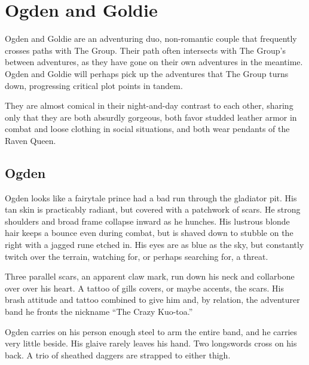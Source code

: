 \section{Ogden and Goldie}\label{sec:ogdenAndGoldie}

Ogden and Goldie are an adventuring duo, non-romantic couple that frequently crosses paths with
The Group.
Their path often intersects with The Group's between adventures, as they have gone on their own
adventures in the meantime.
Ogden and Goldie will perhaps pick up the adventures that The Group turns down, progressing
critical plot points in tandem.

They are almost comical in their night-and-day contrast to each other, sharing only that they are
both absurdly gorgeous, both favor studded leather armor in combat and loose clothing in social
situations, and both wear pendants of the Raven Queen.

\subsection{Ogden}\label{subsec:ogden}

  \begin{aloud}
  \label{description:ogden}
  Ogden looks like a fairytale prince had a bad run through the gladiator pit.
  His tan skin is practicably radiant, but covered with a patchwork of scars.
  He strong shoulders and broad frame collapse inward as he hunches.
  His lustrous blonde hair keeps a bounce even during combat, but is shaved down to stubble on
    the right with a jagged rune etched in.
  His eyes are as blue as the sky, but constantly twitch over the terrain, watching for, or perhaps
    searching for, a threat.

  Three parallel scars, an apparent claw mark, run down his neck and collarbone over over his heart.
  A tattoo of gills covers, or maybe accents, the scars.
  His brash attitude and tattoo combined to give him and, by relation,
    the adventurer band he fronts the nickname ``The Crazy Kuo-toa.''

  Ogden carries on his person enough steel to arm the entire band,
    and he carries very little beside.
  His glaive rarely leaves his hand.
  Two longswords cross on his back.
  A trio of sheathed daggers are strapped to either thigh.
  \end{aloud}

